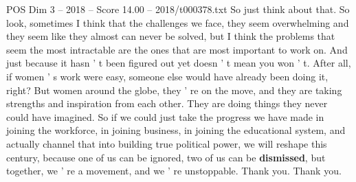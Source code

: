 \begin{textsample}{POS Dim 3 – 2018 – Score 14.00 – 2018/t000378.txt}
So just think about that.
So look, sometimes I think that the challenges we face, they seem overwhelming and they seem like they almost can never be solved, but I think the problems that seem the most intractable are the ones that are most important to work on.
And just because it hasn ' t been figured out yet doesn ' t mean you won ' t.
After all, if women ' s work were easy, someone else would have already been doing it, right?
But women around the globe, they ' re on the move, and they are taking strengths and inspiration from each other.
They are doing things they never could have imagined.
So if we could just take the progress we have made in joining the workforce, in joining business, in joining the educational system, and actually channel that into building true political power, we will reshape this century, because one of us can be ignored, two of us can be \textbf{dismissed}, but together, we ' re a movement, and we ' re unstoppable.
Thank you.
Thank you.

\end{textsample}
